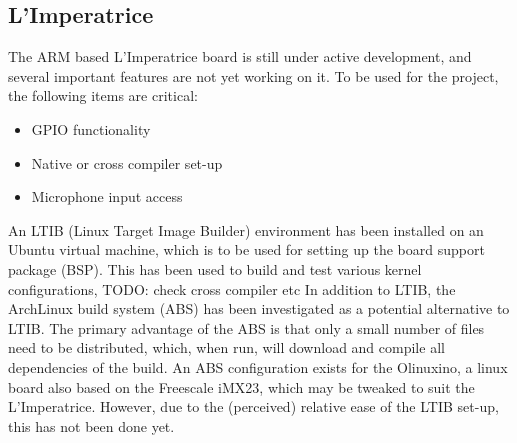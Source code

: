\subsection{L'Imperatrice} %
\label{sub:l_imperatrice}
The ARM based L'Imperatrice board is still under active development, and several important features are not yet working on it.  To be used for the project, the following items are critical:
\begin{itemize}
	\item GPIO functionality
	\item Native or cross compiler set-up
	\item Microphone input access
\end{itemize}
An LTIB (Linux Target Image Builder) environment has been installed on an Ubuntu virtual machine, which is to be used for setting up the board support package (BSP).  This has been used to build and test various kernel configurations,   TODO: check cross compiler etc
In addition to LTIB, the ArchLinux build system (ABS) has been investigated as a potential alternative to LTIB.  The primary advantage of the ABS is that only a small number of files need to be distributed, which, when run, will download and compile all dependencies of the build.  An ABS configuration exists for the Olinuxino, a linux board also based on the Freescale iMX23, which may be tweaked to suit the L'Imperatrice.  However, due to the (perceived) relative ease of the LTIB set-up, this has not been done yet.



